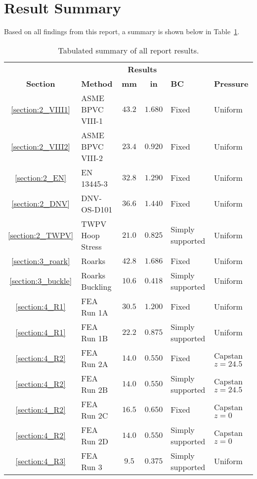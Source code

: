 \section{Result Summary}

Based on all findings from this report, a summary is shown below in Table~\ref{table:5_sum}.

\begin{table}[H]
  \centering
  \caption{Tabulated summary of all report results.}
    \begin{tabular}{clccll}
          &       & \multicolumn{2}{c}{\textbf{Results}} &       &  \\
    \textbf{Section} & \textbf{Method} & \textbf{mm} & \textbf{in} & \textbf{BC} & \textbf{Pressure } \\
    \midrule
          \ref{section:2_VIII1}& ASME BPVC VIII-1 & $43.2$ & $1.680$ & Fixed & Uniform \\
          \ref{section:2_VIII2}& ASME BPVC VIII-2 & $23.4$ & $0.920$ & Fixed & Uniform \\
          \ref{section:2_EN}& EN 13445-3 & $32.8$ & $1.290$ & Fixed & Uniform \\
          \ref{section:2_DNV}& DNV-OS-D101 & $36.6$ & $1.440$ & Fixed & Uniform \\
          \ref{section:2_TWPV}& TWPV Hoop Stress & $21.0$ & $0.825$ & Simply supported & Uniform \\
          \ref{section:3_roark}& Roarks & $42.8$ & $1.686$ & Fixed & Uniform \\
          \ref{section:3_buckle}& Roarks Buckling & $10.6$ & $0.418$ & Simply supported & Uniform \\
          \ref{section:4_R1}& FEA Run 1A & $30.5$ & $1.200$ & Fixed & Uniform \\
          \ref{section:4_R1}& FEA Run 1B & $22.2$ & $0.875$ & Simply supported & Uniform \\
          \ref{section:4_R2}& FEA Run 2A & $14.0$ & $0.550$ & Fixed & Capstan $z=24.5$ \\
          \ref{section:4_R2}& FEA Run 2B & $14.0$ & $0.550$ & Simply supported & Capstan $z=24.5$\\
          \ref{section:4_R2}& FEA Run 2C & $16.5$ & $0.650$ & Fixed & Capstan $z=0$ \\
          \ref{section:4_R2}& FEA Run 2D & $14.0$ & $0.550$ & Simply supported & Capstan $z=0$  \\
          \ref{section:4_R3}& FEA Run 3 & $9.5$ & $0.375$ & Simply supported & Uniform \\
    \end{tabular}
  \label{table:5_sum}
\end{table}%

